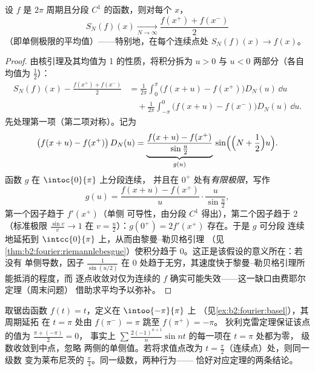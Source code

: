 \begin{theorem}[狄利克雷]\label{thm:b2:fourier:dirichlet}
设 $f$ 是 $2\pi$ 周期且分段 $C^1$ 的函数，则对每个 $x$，
\[
S_N(f)(x) \xrightarrow[N \to \infty]{}
\frac{f(x^+) + f(x^-)}{2}
\]
（即单侧极限的平均值）——特别地，在每个连续点处 $S_N(f)(x) \to
f(x)$。
\end{theorem}


\begin{proof}
由核引理及其均值为 1 的性质，将积分拆为
$u > 0$ 与 $u < 0$ 两部分（各自均值为 $\frac12$）：
\begin{align*}
S_N(f)(x) - \frac{f(x^+) + f(x^-)}{2}
&= \frac{1}{2\pi}\int_{0}^{\pi} \bigl(f(x+u) -
f(x^+)\bigr)D_N(u)\,\dd u\\
&\quad+ \frac{1}{2\pi}\int_{-\pi}^{0}\bigl(f(x+u) -
f(x^-)\bigr)D_N(u)\,\dd u .
\end{align*}
先处理第一项（第二项对称）。记为
\[
\bigl(f(x + u) - f(x^+)\bigr)\,D_N(u)
= \underbrace{\frac{f(x+u) - f(x^+)}{\sin\frac u2}}_{g(u)}\,
\sin\Bigl(\Bigl(N + \frac12\Bigr)u\Bigr) .
\]
函数 $g$ 在 $\intoc{0}{\pi}$ 上分段连续，
并且在 $0^+$ 处有\emph{有限极限}，写作
\[
g(u) = \frac{f(x+u) - f(x^+)}{u}\cdot\frac{u}{\sin\frac u2} ,
\]
第一个因子趋于 $f'(x^+)$（单侧
可导性，由分段 $C^1$ 得出），第二个因子趋于 $2$
（标准极限 $\frac{\sin v}{v} \to 1$ 在 $v = \frac
u2$）：$g(0^+) = 2f'(x^+)$ 存在。于是 $g$ 可分段
连续地延拓到 $\intcc{0}{\pi}$ 上，从而由黎曼–勒贝格引理
（见\cref{thm:b2:fourier:riemannlebesgue}）使积分趋于
$0$。这正是该假设的意义所在：若没有
单侧导数，因子 $\frac{1}{\sin(u/2)}$ 在
$0$ 处趋于无穷，其速度快于黎曼–勒贝格引理所能抵消的程度，而
逐点收敛对仅为连续的
$f$ 确实可能失效——这一缺口由费耶尔定理（周末问题）
借助求平均予以弥补。
\end{proof}

\begin{example}[狄利克雷在跳跃点处的值]\label{ex:b2:fourier:jumpvalue}
取锯齿函数 $f(t) = t$，定义在 $\intoo{-\pi}{\pi}$ 上
（见\cref{ex:b2:fourier:basel}），其周期延拓
在 $t = \pi$ 处由 $f(\pi^-) = \pi$ 跳至 $f(\pi^+) = -\pi$。
狄利克雷定理保证该点的值为 $\frac{\pi + (-\pi)}{2} = 0$，
事实上 $\sum
\frac{2(-1)^{n+1}}{n}\sin nt$ 的每一项在 $t = \pi$ 处都为零，
级数收敛到中点，忽略
两侧的单侧值。若将求值点改为 $t =
\frac\pi2$（连续点）处，则同一级数
变为莱布尼茨的 $\frac\pi4$。同一级数，两种行为——
恰好对应定理的两条结论。
\end{example}

